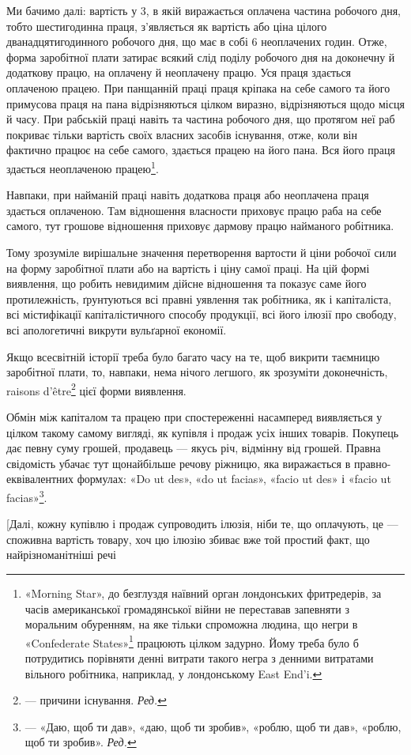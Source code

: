 
Ми бачимо далі: вартість у 3, в якій виражається
оплачена частина робочого дня, тобто шестигодинна праця,
з’являється як вартість або ціна цілого дванадцятигодинного
робочого дня, що має в собі 6 неоплачених годин. Отже, форма
заробітної плати затирає всякий слід поділу робочого дня на
доконечну й додаткову працю, на оплачену й неоплачену працю.
Уся праця здається оплаченою працею. При панщанній праці
праця кріпака на себе самого та його примусова праця на пана
відрізняються цілком виразно, відрізняються щодо місця й часу.
При рабській праці навіть та частина робочого дня, що протягом
неї раб покриває тільки вартість своїх власних засобів існування,
отже, коли він фактично працює на себе самого, здається працею
на його пана. Вся його праця здається неоплаченою працею\footnote{
«Morning Star», до безглуздя наївний орган лондонських фритредерів,
за часів американської громадянської війни не переставав запевняти
з моральним обуренням, на яке тільки спроможна людина, що
негри в «Confederate States»\footnote*{
— південних штатах. \emph{Ред.}
} працюють цілком задурно. Йому треба
було б потрудитись порівняти денні витрати такого негра з денними витратами
вільного робітника, наприклад, у лондонському East End'i.
}.

Навпаки, при найманій праці навіть додаткова праця або
неоплачена праця здається оплаченою. Там відношення власности
приховує працю раба на себе самого, тут грошове відношення
приховує дармову працю найманого робітника.

Тому зрозуміле вирішальне значення перетворення вартости
й ціни робочої сили на форму заробітної плати або на вартість
і ціну самої праці. На цій формі виявлення, що робить невидимим
дійсне відношення та показує саме його протилежність,
ґрунтуються всі правні уявлення так робітника, як і капіталіста,
всі містифікації капіталістичного способу продукції, всі
його ілюзії про свободу, всі апологетичні викрути вульґарної
економії.

Якщо всесвітній історії треба було багато часу на те, щоб
викрити таємницю заробітної плати, то, навпаки, нема нічого
легшого, як зрозуміти доконечність, raisons d’être\footnote*{
— причини існування. \emph{Ред.}
} цієї форми виявлення.

Обмін між капіталом та працею при спостереженні насамперед
виявляється у цілком такому самому вигляді, як купівля
і продаж усіх інших товарів. Покупець дає певну суму грошей,
продавець — якусь річ, відмінну від грошей. Правна свідомість
убачає тут щонайбільше речову ріжницю, яка виражається
в правно-еквівалентних формулах: «Do ut des», «do ut facias»,
«facio ut des» і «facio ut facias»\footnote*{
— «Даю, щоб ти дав», «даю, щоб ти зробив», «роблю, щоб ти дав»,
«роблю, щоб ти зробив». \emph{Ред.}
}.

[Далі, кожну купівлю і продаж супроводить ілюзія, ніби
те, що оплачують, це — споживна вартість товару, хоч цю ілюзію
збиває вже той простий факт, що найрізноманітніші речі
\parbreak{}  %
